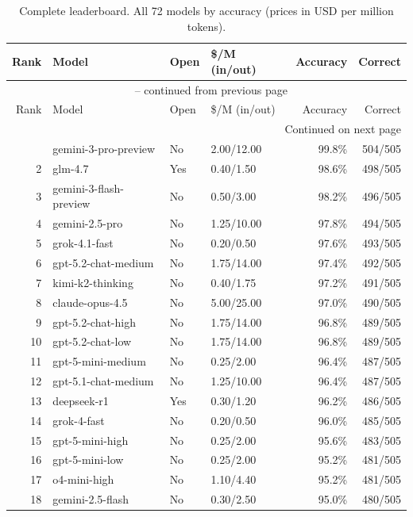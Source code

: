 \documentclass[11pt]{article}
\begin{document}
\begin{longtable}{rlllrr}
  \caption{Complete leaderboard. All 72 models by accuracy (prices in USD per million tokens).} \label{tab:full_leaderboard} \\
  \toprule
  Rank & Model & Open & \$/M (in/out) & Accuracy & Correct \\
  \midrule
  \endfirsthead
  \multicolumn{6}{c}{\tablename\ \thetable{} -- continued from previous page} \\
  \toprule
  Rank & Model & Open & \$/M (in/out) & Accuracy & Correct \\
  \midrule
  \endhead
  \midrule \multicolumn{6}{r}{Continued on next page} \\
  \endfoot
  \bottomrule
  \endlastfoot
  1 & gemini-3-pro-preview & No & 2.00/12.00 & 99.8\% & 504/505 \\
  2 & glm-4.7 & Yes & 0.40/1.50 & 98.6\% & 498/505 \\
  3 & gemini-3-flash-preview & No & 0.50/3.00 & 98.2\% & 496/505 \\
  4 & gemini-2.5-pro & No & 1.25/10.00 & 97.8\% & 494/505 \\
  5 & grok-4.1-fast & No & 0.20/0.50 & 97.6\% & 493/505 \\
  6 & gpt-5.2-chat-medium & No & 1.75/14.00 & 97.4\% & 492/505 \\
  7 & kimi-k2-thinking & No & 0.40/1.75 & 97.2\% & 491/505 \\
  8 & claude-opus-4.5 & No & 5.00/25.00 & 97.0\% & 490/505 \\
  9 & gpt-5.2-chat-high & No & 1.75/14.00 & 96.8\% & 489/505 \\
  10 & gpt-5.2-chat-low & No & 1.75/14.00 & 96.8\% & 489/505 \\
  11 & gpt-5-mini-medium & No & 0.25/2.00 & 96.4\% & 487/505 \\
  12 & gpt-5.1-chat-medium & No & 1.25/10.00 & 96.4\% & 487/505 \\
  13 & deepseek-r1 & Yes & 0.30/1.20 & 96.2\% & 486/505 \\
  14 & grok-4-fast & No & 0.20/0.50 & 96.0\% & 485/505 \\
  15 & gpt-5-mini-high & No & 0.25/2.00 & 95.6\% & 483/505 \\
  16 & gpt-5-mini-low & No & 0.25/2.00 & 95.2\% & 481/505 \\
  17 & o4-mini-high & No & 1.10/4.40 & 95.2\% & 481/505 \\
  18 & gemini-2.5-flash & No & 0.30/2.50 & 95.0\% & 480/505 \\

\end{longtable}
\end{document}
